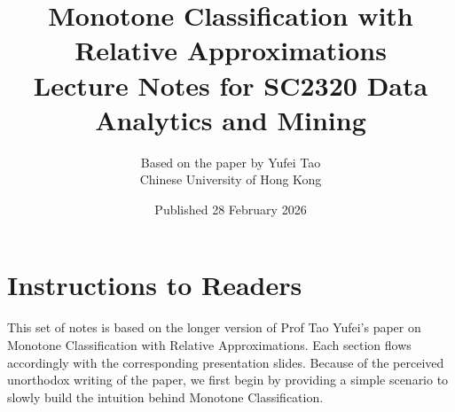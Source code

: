 \documentclass[11pt, a4paper]{article}
\theoremstyle{boxed}
\begin{document}
\title{\textbf{Monotone Classification with Relative Approximations}\\[4pt]
       \large Lecture Notes for SC2320 Data Analytics and Mining}
\author{Based on the paper by Yufei Tao\\
        \small Chinese University of Hong Kong}
\date{Published 28 February 2026}

\maketitle

\section*{Instructions to Readers}
This set of notes is based on the longer version of Prof Tao Yufei's paper on Monotone Classification with Relative Approximations. Each section flows accordingly with the corresponding presentation slides. Because of the perceived unorthodox writing of the paper, we first begin by providing a simple scenario to slowly build the intuition behind Monotone Classification. 





\end{document}

